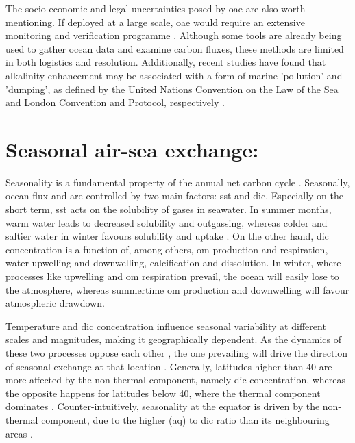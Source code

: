 The socio-economic and legal uncertainties posed by \ac{oae} are also worth mentioning. If deployed at a large scale, \ac{oae} would require an extensive monitoring and verification programme \citep{ho2023chapter}. Although some tools are already being used to gather ocean data and examine carbon fluxes, these methods are limited in both logistics and resolution. Additionally, recent studies have found that alkalinity enhancement may be associated with a form of marine 'pollution' and 'dumping', as defined by the United Nations Convention on the Law of the Sea and London Convention and Protocol, respectively \citep{NAP26278}.

\section{Seasonal air-sea  exchange:}

Seasonality is a fundamental property of the annual net carbon cycle \citep{rodgers2023seasonal, fassbender2022quantifying}. Seasonally, ocean  flux and  are controlled by two main factors: \ac{sst} and \ac{dic}. Especially on the short term, \ac{sst} acts on the solubility of gases in seawater. In summer months, warm water leads to decreased solubility and  outgassing, whereas colder and saltier water in winter favours solubility and  uptake \citep{williams2011ocean}. On the other hand, \ac{dic} concentration is a function of, among others, \ac{om} production and respiration, water upwelling and downwelling, calcification and dissolution. In winter, where processes like upwelling and \ac{om} respiration prevail, the ocean will easily lose  to the atmosphere, whereas summertime \ac{om} production and downwelling will favour atmospheric  drawdown.

Temperature and \ac{dic} concentration influence seasonal variability at different scales and magnitudes, making it geographically dependent. As the dynamics of these two processes oppose each other \citep{lerner2021drivers, takahashi2002global}, the one prevailing will drive the direction of seasonal  exchange at that location \citep{sarmiento2006ocean}. Generally, latitudes higher than 40\textdegree{} are more affected by the non-thermal component, namely \ac{dic} concentration, whereas the opposite happens for latitudes below 40\textdegree{}, where the thermal component dominates \citep{mcneil2019changing, gallego2018drivers, sarmiento2006ocean}. Counter-intuitively, seasonality at the equator is driven by the non-thermal component, due to the higher (aq) to \ac{dic} ratio than its neighbouring areas \citep{fassbender2017nonuniform}. 

